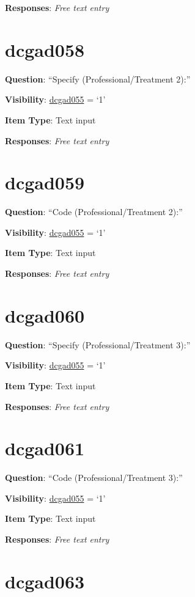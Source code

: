 \documentclass[]{book}
\begin{document}
\textbf{Responses}: \emph{Free text entry}

\hypertarget{dcgad058}{%
\section{dcgad058}\label{dcgad058}}

\textbf{Question}: ``Specify (Professional/Treatment 2):''

\textbf{Visibility}: \protect\hyperlink{dcgad055}{dcgad055} = `1'

\textbf{Item Type}: Text input

\textbf{Responses}: \emph{Free text entry}

\hypertarget{dcgad059}{%
\section{dcgad059}\label{dcgad059}}

\textbf{Question}: ``Code (Professional/Treatment 2):''

\textbf{Visibility}: \protect\hyperlink{dcgad055}{dcgad055} = `1'

\textbf{Item Type}: Text input

\textbf{Responses}: \emph{Free text entry}

\hypertarget{dcgad060}{%
\section{dcgad060}\label{dcgad060}}

\textbf{Question}: ``Specify (Professional/Treatment 3):''

\textbf{Visibility}: \protect\hyperlink{dcgad055}{dcgad055} = `1'

\textbf{Item Type}: Text input

\textbf{Responses}: \emph{Free text entry}

\hypertarget{dcgad061}{%
\section{dcgad061}\label{dcgad061}}

\textbf{Question}: ``Code (Professional/Treatment 3):''

\textbf{Visibility}: \protect\hyperlink{dcgad055}{dcgad055} = `1'

\textbf{Item Type}: Text input

\textbf{Responses}: \emph{Free text entry}

\hypertarget{dcgad063}{%
\section{dcgad063}\label{dcgad063}}
\end{document}
